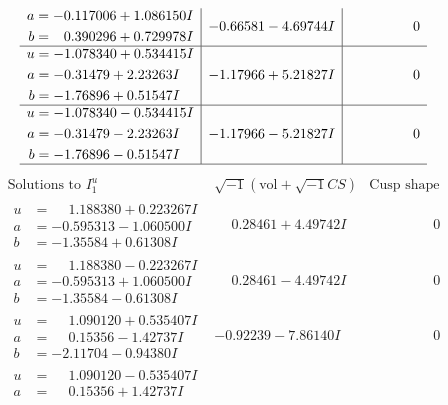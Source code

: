 \documentclass[1p]{elsarticle_modified}
\theoremstyle{definition}
\newcommand{\I}{\sqrt{-1}}
\begin{document}
$$\begin{array}{c|c|c}
\begin{aligned}
a &= -0.117006 + 1.086150 I \\
b &= \phantom{-}0.390296 + 0.729978 I\end{aligned}
 & -0.66581 - 4.69744 I & \phantom{-0.000000 } 0 \\ \hline\begin{aligned}
u &= -1.078340 + 0.534415 I \\
a &= -0.31479 + 2.23263 I \\
b &= -1.76896 + 0.51547 I\end{aligned}
 & -1.17966 + 5.21827 I & \phantom{-0.000000 } 0 \\ \hline\begin{aligned}
u &= -1.078340 - 0.534415 I \\
a &= -0.31479 - 2.23263 I \\
b &= -1.76896 - 0.51547 I\end{aligned}
 & -1.17966 - 5.21827 I & \phantom{-0.000000 } 0\\
 \hline 
 \end{array}$$\newpage$$\begin{array}{c|c|c}  
\text{Solutions to }I^u_{1}& \I (\text{vol} + \sqrt{-1}CS) & \text{Cusp shape}\\
 \hline 
\begin{aligned}
u &= \phantom{-}1.188380 + 0.223267 I \\
a &= -0.595313 - 1.060500 I \\
b &= -1.35584 + 0.61308 I\end{aligned}
 & \phantom{-}0.28461 + 4.49742 I & \phantom{-0.000000 } 0 \\ \hline\begin{aligned}
u &= \phantom{-}1.188380 - 0.223267 I \\
a &= -0.595313 + 1.060500 I \\
b &= -1.35584 - 0.61308 I\end{aligned}
 & \phantom{-}0.28461 - 4.49742 I & \phantom{-0.000000 } 0 \\ \hline\begin{aligned}
u &= \phantom{-}1.090120 + 0.535407 I \\
a &= \phantom{-}0.15356 - 1.42737 I \\
b &= -2.11704 - 0.94380 I\end{aligned}
 & -0.92239 - 7.86140 I & \phantom{-0.000000 } 0 \\ \hline\begin{aligned}
u &= \phantom{-}1.090120 - 0.535407 I \\
a &= \phantom{-}0.15356 + 1.42737 I \\

\end{aligned}
\end{array}$$
\end{document}
